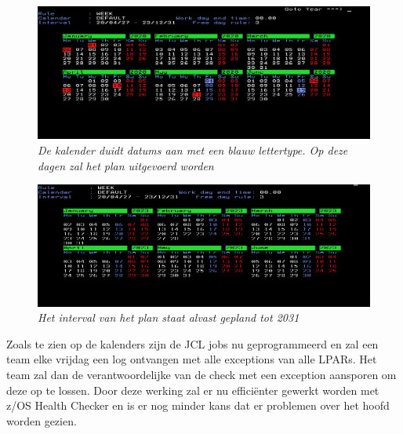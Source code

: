 \begin{figure}[h]
	\centering
	\includegraphics[width=0.8\linewidth]{img/Calender}
	\caption[Kalender IWS]{{\small \textit{De kalender duidt datums aan met een blauw lettertype. Op deze dagen zal het plan uitgevoerd worden}}}
	\label{fig:calender}
\end{figure}
\begin{figure}[h]
	\centering
	\includegraphics[width=0.8\linewidth]{img/Caleder2030}
	\caption[Kalender IWS 2030]{{\small \textit{Het interval van het plan staat alvast gepland tot 2031}}}
	\label{fig:caleder2030}
\end{figure}

Zoals te zien op de kalenders zijn de JCL jobs nu geprogrammeerd en zal een team elke vrijdag een log ontvangen met alle exceptions van alle LPARs. Het team zal dan de verantwoordelijke van de check met een exception aansporen om deze op te lossen. Door deze werking zal er nu efficiënter gewerkt worden met z/OS Health Checker en is er nog minder kans dat er problemen over het hoofd worden gezien.